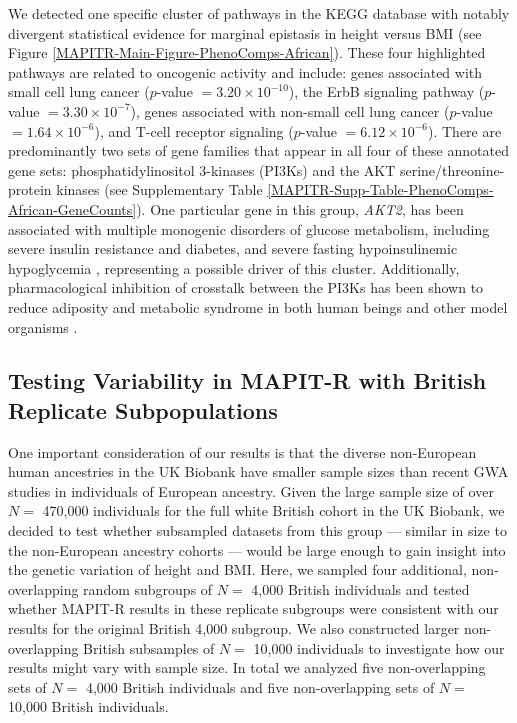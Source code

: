 \documentclass[10pt]{article}
\begin{document}
We detected one specific cluster of pathways in the KEGG database with notably divergent statistical evidence for marginal epistasis in height versus BMI (see Figure \ref{MAPITR-Main-Figure-PhenoComps-African}). These four highlighted pathways are related to oncogenic activity and include: genes associated with small cell lung cancer ($p$-value $= 3.20\times 10^{-10}$), the ErbB signaling pathway ($p$-value $= 3.30\times 10^{-7}$), genes associated with non-small cell lung cancer ($p$-value $= 1.64\times 10^{-6}$), and T-cell receptor signaling ($p$-value $= 6.12\times 10^{-6}$). There are predominantly two sets of gene families that appear in all four of these annotated gene sets: phosphatidylinositol 3-kinases (PI3Ks) and the AKT serine/threonine-protein kinases (see Supplementary Table \ref{MAPITR-Supp-Table-PhenoComps-African-GeneCounts}). One particular gene in this group, \textit{AKT2}, has been associated with multiple monogenic disorders of glucose metabolism, including severe insulin resistance and diabetes, and severe fasting hypoinsulinemic hypoglycemia \cite{George2004,Manning2017,Latva-Rasku2018}, representing a possible driver of this cluster. Additionally, pharmacological inhibition of crosstalk between the PI3Ks has been shown to reduce adiposity and metabolic syndrome in both human beings and other model organisms \cite{Ortega-Molina2015,Justice2017,Grigsby2018,Huang2018,Couto2019}.

\subsection*{Testing Variability in MAPIT-R with British Replicate Subpopulations}

One important consideration of our results is that the diverse non-European human ancestries in the UK Biobank have smaller sample sizes than recent GWA studies in individuals of European ancestry. Given the large sample size of over $N =$ 470,000 individuals for the full white British cohort in the UK Biobank, we decided to test whether subsampled datasets from this group --- similar in size to the non-European ancestry cohorts --- would be large enough to gain insight into the genetic variation of height and BMI. Here, we sampled four additional, non-overlapping random subgroups of $N =$ 4,000 British individuals and tested whether MAPIT-R results in these replicate subgroups were consistent with our results for the original British 4,000 subgroup. We also constructed larger non-overlapping British subsamples of $N =$ 10,000 individuals to investigate how our results might vary with sample size. In total we analyzed five non-overlapping sets of $N =$ 4,000 British individuals and five non-overlapping sets of $N =$ 10,000 British individuals.
\end{document}
